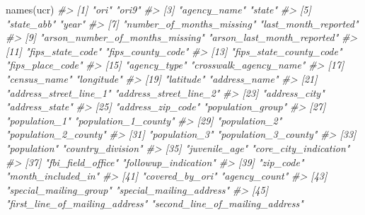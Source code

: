 \documentclass[
]{krantz}
\makeatletter
\newenvironment{Shaded}{\begin{snugshade}}{\end{snugshade}}
\newcommand{\CommentTok}[1]{\textcolor[rgb]{0.37,0.37,0.37}{\textit{#1}}}
\newcommand{\FunctionTok}[1]{\textcolor[rgb]{0,0,0}{#1}}
\newcommand{\NormalTok}[1]{#1}
\newenvironment{kframe}{%
\medskip{}
\setlength{\fboxsep}{.8em}
 \def\at@end@of@kframe{}%
 \ifinner\ifhmode%
  \def\at@end@of@kframe{\end{minipage}}%
  \begin{minipage}{\columnwidth}%
 \fi\fi%
 \def\FrameCommand##1{\hskip\@totalleftmargin \hskip-\fboxsep
 \colorbox{shadecolor}{##1}\hskip-\fboxsep
     \hskip-\linewidth \hskip-\@totalleftmargin \hskip\columnwidth}%
 \MakeFramed {\advance\hsize-\width
   \@totalleftmargin\z@ \linewidth\hsize
   \@setminipage}}%
 {\par\unskip\endMakeFramed%
 \at@end@of@kframe}
\renewenvironment{Shaded}{\begin{kframe}}{\end{kframe}}
\makeatother
\begin{document}
\begin{Shaded}
\begin{Highlighting}[]
\FunctionTok{names}\NormalTok{(ucr)}
\CommentTok{\#\textgreater{}   [1] "ori"                              "ori9"                            }
\CommentTok{\#\textgreater{}   [3] "agency\_name"                      "state"                           }
\CommentTok{\#\textgreater{}   [5] "state\_abb"                        "year"                            }
\CommentTok{\#\textgreater{}   [7] "number\_of\_months\_missing"         "last\_month\_reported"             }
\CommentTok{\#\textgreater{}   [9] "arson\_number\_of\_months\_missing"   "arson\_last\_month\_reported"       }
\CommentTok{\#\textgreater{}  [11] "fips\_state\_code"                  "fips\_county\_code"                }
\CommentTok{\#\textgreater{}  [13] "fips\_state\_county\_code"           "fips\_place\_code"                 }
\CommentTok{\#\textgreater{}  [15] "agency\_type"                      "crosswalk\_agency\_name"           }
\CommentTok{\#\textgreater{}  [17] "census\_name"                      "longitude"                       }
\CommentTok{\#\textgreater{}  [19] "latitude"                         "address\_name"                    }
\CommentTok{\#\textgreater{}  [21] "address\_street\_line\_1"            "address\_street\_line\_2"           }
\CommentTok{\#\textgreater{}  [23] "address\_city"                     "address\_state"                   }
\CommentTok{\#\textgreater{}  [25] "address\_zip\_code"                 "population\_group"                }
\CommentTok{\#\textgreater{}  [27] "population\_1"                     "population\_1\_county"             }
\CommentTok{\#\textgreater{}  [29] "population\_2"                     "population\_2\_county"             }
\CommentTok{\#\textgreater{}  [31] "population\_3"                     "population\_3\_county"             }
\CommentTok{\#\textgreater{}  [33] "population"                       "country\_division"                }
\CommentTok{\#\textgreater{}  [35] "juvenile\_age"                     "core\_city\_indication"            }
\CommentTok{\#\textgreater{}  [37] "fbi\_field\_office"                 "followup\_indication"             }
\CommentTok{\#\textgreater{}  [39] "zip\_code"                         "month\_included\_in"               }
\CommentTok{\#\textgreater{}  [41] "covered\_by\_ori"                   "agency\_count"                    }
\CommentTok{\#\textgreater{}  [43] "special\_mailing\_group"            "special\_mailing\_address"         }
\CommentTok{\#\textgreater{}  [45] "first\_line\_of\_mailing\_address"    "second\_line\_of\_mailing\_address"  }

\end{Highlighting}
\end{Shaded}
\end{document}
